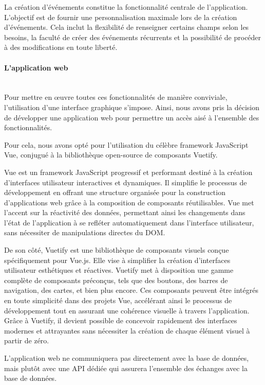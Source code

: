 La création d'événements constitue la fonctionnalité centrale de l'application. L'objectif est de fournir une personnalisation maximale lors de la création d'événements. Cela inclut la flexibilité de renseigner certains champs selon les besoins, la faculté de créer des événements récurrents et la possibilité de procéder à des modifications en toute liberté.

\paragraph{L'application web}
~~\\

Pour mettre en œuvre toutes ces fonctionnalités de manière conviviale, l'utilisation d'une interface graphique s'impose. Ainsi, nous avons pris la décision de développer une application web pour permettre un accès aisé à l'ensemble des fonctionnalités.

Pour cela, nous avons opté pour l'utilisation du célèbre framework JavaScript Vue, conjugué à la bibliothèque open-source de composants Vuetify.

Vue est un framework JavaScript progressif et performant destiné à la création d'interfaces utilisateur interactives et dynamiques. Il simplifie le processus de développement en offrant une structure organisée pour la construction d'applications web grâce à la composition de composants réutilisables. Vue met l'accent sur la réactivité des données, permettant ainsi les changements dans l'état de l'application à se refléter automatiquement dans l'interface utilisateur, sans nécessiter de manipulations directes du DOM.

De son côté, Vuetify est une bibliothèque de composants visuels conçue spécifiquement pour Vue.js. Elle vise à simplifier la création d'interfaces utilisateur esthétiques et réactives. Vuetify met à disposition une gamme complète de composants préconçus, tels que des boutons, des barres de navigation, des cartes, et bien plus encore. Ces composants peuvent être intégrés en toute simplicité dans des projets Vue, accélérant ainsi le processus de développement tout en assurant une cohérence visuelle à travers l'application. Grâce à Vuetify, il devient possible de concevoir rapidement des interfaces modernes et attrayantes sans nécessiter la création de chaque élément visuel à partir de zéro.

L'application web ne communiquera pas directement avec la base de données, mais plutôt avec une API dédiée qui assurera l'ensemble des échanges avec la base de données.

